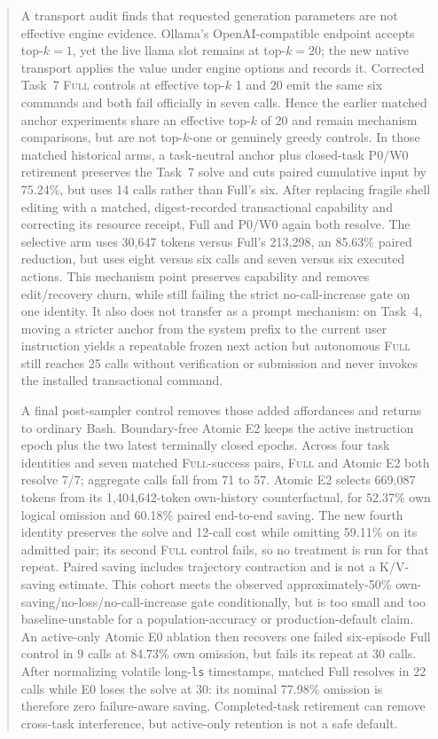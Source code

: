 \documentclass[11pt]{article}
\begin{document}
\begin{abstract}
A transport audit finds that requested generation parameters are not effective
engine evidence.  Ollama's OpenAI-compatible endpoint accepts top-$k=1$, yet
the live llama slot remains at top-$k=20$; the new native transport applies the
value under engine options and records it.  Corrected Task~7 \textsc{Full}
controls at effective top-$k$ 1 and 20 emit the same six commands and both fail
officially in seven calls.  Hence the earlier matched anchor experiments share
an effective top-$k$ of 20 and remain mechanism comparisons, but are not
top-$k$-one or genuinely greedy controls.  In those matched historical arms, a
task-neutral anchor plus closed-task P0/W0 retirement preserves the Task~7
solve and cuts paired cumulative input by 75.24\%, but uses 14 calls rather
than Full's six.  After replacing fragile shell editing with a matched,
digest-recorded transactional capability and correcting its resource receipt,
Full and P0/W0 again both resolve.  The selective arm uses 30,647 tokens versus
Full's 213,298, an 85.63\% paired reduction, but uses eight versus six calls
and seven versus six executed actions.  This mechanism point preserves
capability and removes edit/recovery churn, while still failing the strict
no-call-increase gate on one identity.  It also does not transfer as a prompt
mechanism: on Task~4, moving a stricter anchor from the system prefix to the
current user instruction yields a repeatable frozen next action but autonomous
\textsc{Full} still reaches 25 calls without verification or submission and
never invokes the installed transactional command.

A final post-sampler control removes those added affordances and returns to
ordinary Bash.  Boundary-free Atomic E2 keeps the active instruction epoch
plus the two latest terminally closed epochs.  Across four task identities
and seven matched \textsc{Full}-success pairs, \textsc{Full} and Atomic E2 both
resolve 7/7; aggregate calls fall from 71 to 57.  Atomic E2 selects 669,087
tokens from its 1,404,642-token own-history counterfactual, for 52.37\% own
logical omission and 60.18\% paired end-to-end saving.  The new fourth
identity preserves the solve and 12-call cost while omitting 59.11\% on its
admitted pair; its second \textsc{Full} control fails, so no treatment is run
for that repeat.  Paired saving includes trajectory contraction and is not a
K/V-saving estimate.  This cohort meets the observed approximately-50\%
own-saving/no-loss/no-call-increase gate conditionally, but is too small and
too baseline-unstable for a population-accuracy or production-default claim.
An active-only Atomic E0 ablation then recovers one failed six-episode Full
control in 9 calls at 84.73\% own omission, but fails its repeat at 30 calls.
After normalizing volatile long-\texttt{ls} timestamps, matched Full resolves
in 22 calls while E0 loses the solve at 30: its nominal 77.98\% omission is
therefore zero failure-aware saving.  Completed-task retirement can remove
cross-task interference, but active-only retention is not a safe default.


\end{abstract}
\end{document}
